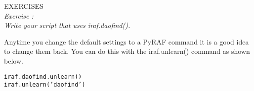 {\color{blue} {\sf\small EXERCISES}} \\
{\it Exercise  :  \\
  Write your script that uses {\sf\small iraf.daofind()}.}

Anytime you change the default settings to a PyRAF command it is a
good idea to change them back.  You can do this with the {\sf\small
  iraf.unlearn()} command as shown below.

\begin{alltt}
\pyraftab iraf.daofind.unlearn()
\pyraftab iraf.unlearn('daofind')
\end{alltt}






